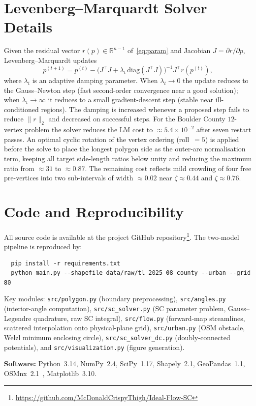 \documentclass[11pt]{article}
\newcommand{\RR}{\mathbb{R}}
\begin{document}


\clearpage
\appendix
\section{Levenberg--Marquardt Solver Details}
\label{app:lm}

Given the residual vector $r(p) \in \RR^{n-1}$ of~\eqref{eq:param} and
Jacobian $J = \partial r / \partial p$, Levenberg--Marquardt updates
\begin{equation}
  p^{(t+1)} = p^{(t)}
    - \bigl( J^\top J + \lambda_t\, \mathrm{diag}(J^\top J) \bigr)^{-1}
      J^\top r(p^{(t)}),
  \label{eq:lm}
\end{equation}
where $\lambda_t$ is an adaptive damping parameter. When $\lambda_t \to 0$
the update reduces to the Gauss--Newton step (fast second-order convergence
near a good solution); when $\lambda_t \to \infty$ it reduces to a small
gradient-descent step (stable near ill-conditioned regions). The damping is
increased whenever a proposed step fails to reduce $\|r\|_2$ and decreased
on successful steps. For the Boulder County $12$-vertex problem the solver reduces the
LM cost to $\approx 5.4 \times 10^{-2}$ after seven restart passes.
An optimal cyclic rotation of the vertex ordering (roll~$=5$) is applied
before the solve to place the longest polygon side as the outer-arc normalisation
term, keeping all target side-length ratios below unity and reducing the
maximum ratio from $\approx 31$ to $\approx 0.87$. The remaining cost
reflects mild crowding of four free pre-vertices into two sub-intervals
of width $\approx 0.02$ near $\zeta \approx 0.44$ and $\zeta \approx 0.76$.

\section{Code and Reproducibility}
\label{app:code}

All source code is available at the project GitHub
repository\footnote{\url{https://github.com/McDonaldCrispyThigh/Ideal-Flow-SC}}.
The two-model pipeline is reproduced by:
\begin{verbatim}
  pip install -r requirements.txt
  python main.py --shapefile data/raw/tl_2025_08_county --urban --grid 80
\end{verbatim}
Key modules: \texttt{src/polygon.py} (boundary preprocessing),
\texttt{src/angles.py} (interior-angle computation),
\texttt{src/sc\_solver.py} (SC parameter problem, Gauss--Legendre quadrature,
raw SC integral),
\texttt{src/flow.py} (forward-map streamlines, scattered interpolation onto
physical-plane grid),
\texttt{src/urban.py} (OSM obstacle, Welzl minimum enclosing circle),
\texttt{src/sc\_solver\_dc.py} (doubly-connected potentials), and
\texttt{src/visualization.py} (figure generation).

\noindent\textbf{Software:} Python~3.14, NumPy~2.4, SciPy~1.17,
Shapely~2.1, GeoPandas~1.1, OSMnx~2.1~\citep{BG17}, Matplotlib~3.10.
\end{document}
